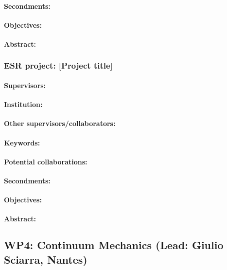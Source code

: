 \documentclass[12pt]{article}
\begin{document}
\paragraph{Secondments:} 
\paragraph{Objectives:} 
\paragraph{Abstract:} 

\subsubsection*{ESR project: [Project title]}
\paragraph{Supervisors:} 
\paragraph{Institution:} 
\paragraph{Other supervisors/collaborators:} 
\paragraph{Keywords:} 
\paragraph{Potential collaborations:} 
\paragraph{Secondments:} 
\paragraph{Objectives:} 
\paragraph{Abstract:} 

\subsection{WP4: Continuum Mechanics (Lead: Giulio Sciarra, Nantes)}
\end{document}
